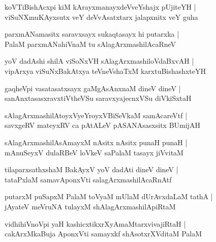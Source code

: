 \documentclass[twoside,12pt,openright]{book}
\newcounter{shloka}[chapter]
\begin{document}
\begin{shloka}%
koVTiBishAcxpi kiM kArayxmanayxdeVveYshajx pUjiteYH |\\
viSuNXmuKAyxsutx veY deVvAsatxtarx jalapxnitx veY guha 
\end{shloka}

\begin{shloka}%
parxmANamasitx saravxsayx sukaqtasayx hi putarxka |\\
PalaM parxmANahiVnaM tu sAlagArxmashilAcaRneV 
\end{shloka}

\begin{shloka}%
yoV dadAshi shilA viSoNxVH sAlagArxmashiloVdaBxvAH |\\
vipArxya viSuNxBakAtxya teVneVshaTxM karxtuBishashxteYH
\end{shloka}

\begin{shloka}%
gaqheVpi vasatasatxsayx gaMgAsAnxnaM dineV dineV |\\
sanAnxtasasxravxtiVtheVSu saravxyajecnxVSu diVkiSxtaH
\end{shloka}

\begin{shloka}%
sAlagArxmashilAtoyxVyeYroyxVBiSeVkaM samAcareVtf |\\
savxgeRV mateyxRV ca pAtALeV pASANAsasxsitx BUmijAH 
\end{shloka}

\begin{shloka}%
sAlagArxmashilAsAmayxM nAsitx nAsitx punaH punaH |\\
mAnuSeyxV dulaRBeV loVkeV saPalaM tasayx jiVvitaM 
\end{shloka}

\begin{shloka}%
tilaparxsathxshaM BakAyxV yoV dadAti dineV dineV |\\
tataPxlaM samavAponxVti salagArxmashilAcaRnAtf
\end{shloka}

\begin{shloka}%
putarxM puSapxM PalaM toVyaM mUlaM dUrAvxdaLaM tathA |\\
jAyateV meVruNA tulayxM shAlagArxmashilApiRtaM 
\end{shloka}

\begin{shloka}%
vidhihiVnoVpi yaH kashicxtikxrXyAmaMtarxvivajiRtaH |\\
cakArxMkaBuja AponxVti samayxkf shAsotxrXVditaM PalaM 
\end{shloka}
\end{document}
